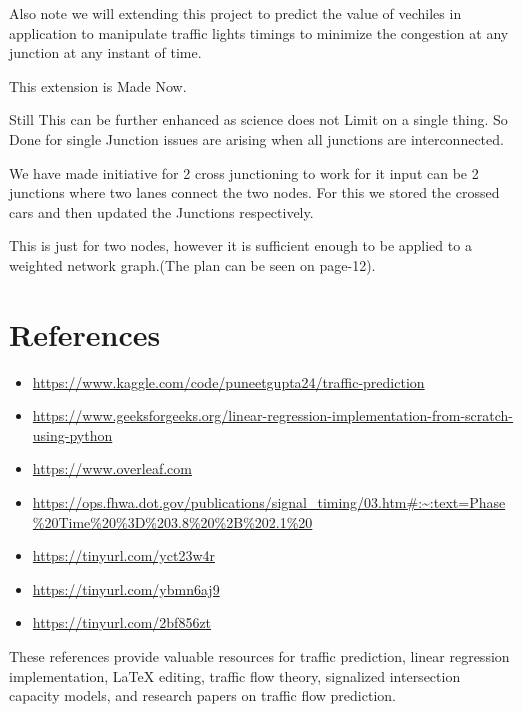 \documentclass{IEEEtran}
\begin{document}
Also note we will extending this project to predict the value of vechiles in application to manipulate traffic lights timings to minimize the congestion at any junction at any instant of time.

This extension is Made Now.

Still This can be further enhanced as science does not Limit on a single thing. 
So Done for single Junction issues are arising when all junctions are interconnected.

We have made initiative for 2 cross junctioning to work for it input can be 2 junctions where two lanes connect the two nodes.
For this we stored the  crossed cars and then updated the Junctions respectively.

This is just for two nodes, however it is sufficient enough to be applied to a weighted network graph.(The plan can be seen on page-12).


\section*{References}
\begin{itemize}
    \item \url{https://www.kaggle.com/code/puneetgupta24/traffic-prediction}
    \item \url{https://www.geeksforgeeks.org/linear-regression-implementation-from-scratch-using-python}
    \item \url{https://www.overleaf.com}
    \item \url{https://ops.fhwa.dot.gov/publications/signal\_timing/03.htm#:~:text=Phase%20Time%20%3D%203.8%20%2B%202.1%20}
    \item \url{https://tinyurl.com/yct23w4r}
    \item \url{https://tinyurl.com/ybmn6aj9}
    \item \url{https://tinyurl.com/2bf856zt}
    
\end{itemize}


These references provide valuable resources for traffic prediction, linear regression implementation, LaTeX editing, traffic flow theory, signalized intersection capacity models, and research papers on traffic flow prediction.
\end{document}
